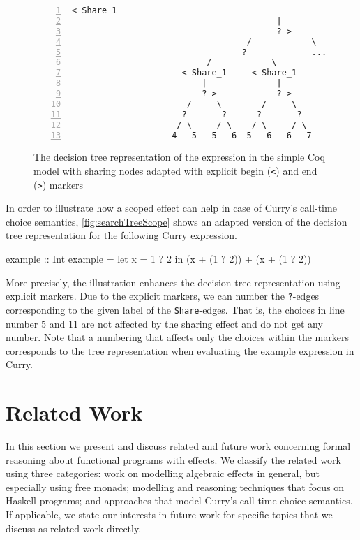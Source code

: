 \begin{figure}[tb]
 \centering
\begin{Verbatim}[numbers=left, xleftmargin=5mm]
                                     < Share_1
                                         |
                                         ? >
                                   /            \
                                  ?             ...
                           /            \
                      < Share_1     < Share_1
                          |              |
                          ? >            ? >
                       /     \        /     \
                      ?       ?      ?       ?
                     / \     / \    / \     / \
                    4   5   5   6  5   6   6   7
\end{Verbatim}
\caption{The decision tree representation of the expression  in the simple Coq model with sharing nodes adapted with explicit begin (\texttt{<}) and end (\texttt{>}) markers}
\label{fig:searchTreeScope}
\end{figure}

In order to illustrate how a scoped effect can help in case of Curry's call\--time choice semantics, \autoref{fig:searchTreeScope} shows an adapted version of the decision tree representation for the following Curry expression.

\begin{curry}
example :: Int
example = let x = 1 ? 2 in (x + (1 ? 2)) + (x + (1 ? 2))  
\end{curry}

More precisely, the illustration enhances the decision tree representation using explicit markers.
Due to the explicit markers, we can number the \texttt{?}\--edges corresponding to the given label of the \texttt{Share}\--edges.
That is, the choices in line number $5$ and $11$ are not affected by the sharing effect and do not get any number.
Note that a numbering that affects only the choices within the markers corresponds to the tree representation when evaluating the example expression in Curry.

\section{Related Work}

In this section we present and discuss related and future work concerning formal reasoning about functional programs with effects.
We classify the related work using three categories: work on modelling algebraic effects in general, but especially using free monads; modelling and reasoning techniques that focus on Haskell programs; and approaches that model Curry's call\--time choice semantics.
If applicable, we state our interests in future work for specific topics that we discuss as related work directly.

